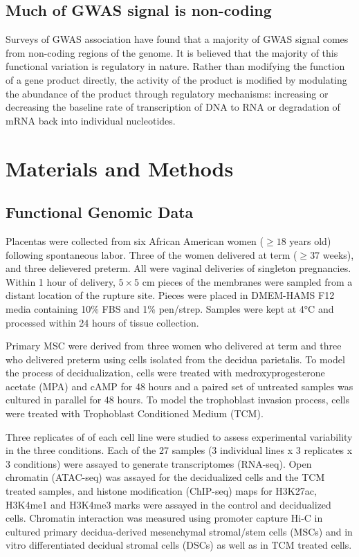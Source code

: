 \subsection{Much of GWAS signal is non-coding}\label{sec:org3ac0b01}

Surveys of GWAS association have found that a majority of GWAS signal comes from non-coding regions of the genome.  It is believed that the majority 
of this functional variation is regulatory in nature.  Rather than modifying the function of a gene product directly, the activity of the product is modified
by modulating the abundance of the product through regulatory mechanisms: increasing or decreasing the baseline rate of transcription of DNA to RNA or degradation of mRNA back into individual nucleotides.  


\section{Materials and Methods}\label{sec:org39326e2}

\subsection{Functional Genomic Data}\label{sec:org702e301}
  
Placentas were collected from six African American women (\(\geq 18\) years old) following spontaneous labor.
Three of the women delivered at term (\(\geq 37\) weeks), and three delievered preterm.
All were vaginal deliveries of singleton pregnancies. Within 1 hour of delivery, $5 \times 5$ cm pieces of the membranes were
sampled from a distant location of the rupture site. Pieces were placed in DMEM-HAMS F12 media containing 10\% FBS and
1\% pen/strep. Samples were kept at 4°C and processed within 24 hours of tissue collection.

Primary MSC were derived from three women who delivered at term and three who delivered preterm using cells isolated from the decidua parietalis.
To model the process of decidualization, cells were treated with medroxyprogesterone acetate (MPA)
and cAMP for 48 hours and a paired set of untreated samples was cultured in parallel for 48 hours.
To model the trophoblast invasion process, cells were treated with Trophoblast Conditioned Medium (TCM).

Three replicates of of each cell line were studied to assess experimental variability in the three conditions.
Each of the 27 samples (3 individual lines x 3 replicates x 3 conditions) were assayed to generate transcriptomes (RNA-seq).
Open chromatin (ATAC-seq) was assayed for the decidualized cells and the TCM treated samples,
and histone modification (ChIP-seq) maps for H3K27ac, H3K4me1 and H3K4me3 marks were assayed in the control and decidualized cells.
Chromatin interaction was measured using promoter capture Hi-C in cultured primary decidua-derived mesenchymal stromal/stem cells (MSCs)
and in vitro differentiated decidual stromal cells (DSCs) as well as in TCM treated cells.

